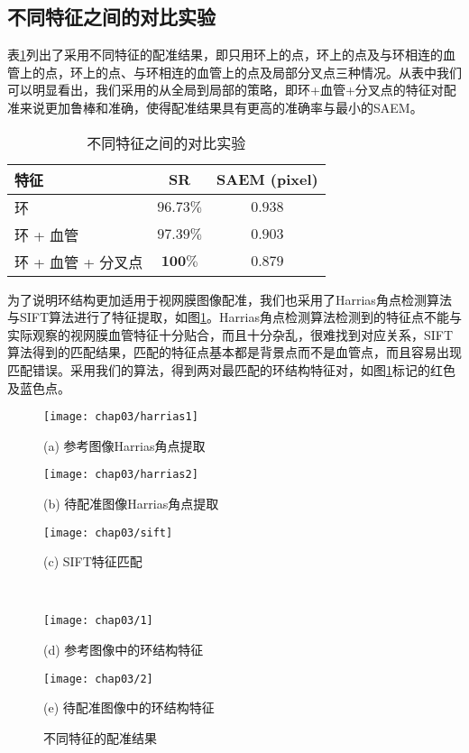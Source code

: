 \subsection{不同特征之间的对比实验}

表\ref{tab:features}列出了采用不同特征的配准结果，即只用环上的点，环上的点及与环相连的血管上的点，环上的点、与环相连的血管上的点及局部分叉点三种情况。从表中我们可以明显看出，我们采用的从全局到局部的策略，即环+血管+分叉点的特征对配准来说更加鲁棒和准确，使得配准结果具有更高的准确率与最小的SAEM。

\begin{table}[!ht]
\caption{不同特征之间的对比实验}
\centering
\begin{tabular}{p{3.6cm}cc}
\toprule
特征 & SR  & SAEM (pixel)\\
\midrule
环 & $96.73\%$ & $0.938$\\
环 + 血管  & $97.39\%$ & $0.903$\\
环 + 血管 + 分叉点 & $\mathbf{100\%}$ & $\mathbf{0.879}$ \\
\bottomrule
\end{tabular}
\label{tab:features}
\end{table}

为了说明环结构更加适用于视网膜图像配准，我们也采用了Harrias角点检测算法与SIFT算法进行了特征提取，如图\ref{fig:ComparisionFeature}。Harrias角点检测算法检测到的特征点不能与实际观察的视网膜血管特征十分贴合，而且十分杂乱，很难找到对应关系，SIFT算法得到的匹配结果，匹配的特征点基本都是背景点而不是血管点，而且容易出现匹配错误。采用我们的算法，得到两对最匹配的环结构特征对，如图\ref{fig:ComparisionFeature}标记的红色及蓝色点。

\begin{figure}[!ht]
\centering
\begin{minipage}[b]{0.48\textwidth} 
      \centering 
      \texttt{[image: chap03/harrias1]}
        \centerline{(a) 参考图像Harrias角点提取}\medskip
\end{minipage}
  \begin{minipage}[b]{0.48\textwidth}
    \centering
    \texttt{[image: chap03/harrias2]}
      \centerline{(b) 待配准图像Harrias角点提取}\medskip
  \end{minipage}
\begin{minipage}[b]{1\textwidth}
	\centering
      \texttt{[image: chap03/sift]}
        \centerline{(c) SIFT特征匹配}\medskip
    \end{minipage}
\\
  \begin{minipage}[b]{0.48\textwidth}
    \centering
    \texttt{[image: chap03/1]}
      \centerline{(d) 参考图像中的环结构特征}\medskip
  \end{minipage}
 \begin{minipage}[b]{0.48\textwidth}
    \centering
      \texttt{[image: chap03/2]}
        \centerline{(e) 待配准图像中的环结构特征}\medskip
    \end{minipage}
\caption{不同特征的配准结果}
\label{fig:ComparisionFeature}
\end{figure}


